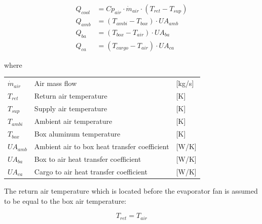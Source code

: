 \begin{align}
	Q_{cool}   & = Cp_{air} \cdot \dot{m}_{air} \cdot (T_{ret} - T_{sup})	\label{eq:box_Qcool} \\
	Q_{amb}    & = (T_{ambi} - T_{box}) \cdot U A_{amb}						\label{eq:box_Qab}   \\
	Q_{ba}     & = (T_{box} - T_{air}) \cdot U A_{ba}						\label{eq:box_Qba}   \\
	Q_{ca}     & = (T_{cargo} - T_{air}) \cdot U A_{ca}                  	\label{eq:box_Qca}
\end{align}

where
\begin{center}
	\begin{tabular}{l p{8cm} l}
		$\dot{m}_{air}$ & Air mass flow                                & [\si{kg}/{\si{s}}] \\
		$T_{ret}$       & Return air temperature                       & [\si{K}]           \\
		$T_{sup}$       & Supply air temperature                       & [\si{K}]           \\
		$T_{ambi}$      & Ambient air temperature                      & [\si{K}]           \\
		$T_{box}$       & Box aluminum temperature                     & [\si{K}]           \\
		$U A_{amb}$     & Ambient air to box heat transfer coefficient & [\si{W}/\si{K}]    \\
		$U A_{ba}$      & Box to air heat transfer coefficient         & [\si{W}/\si{K}]    \\
		$U A_{ca}$  	& Cargo to air heat transfer coefficient       & [\si{W}/\si{K}]    \\
	\end{tabular}
\end{center}


The return air temperature which is located before the evaporator fan is assumed to be equal to the box air temperature:

\begin{equation} \label{eq:box_Tref}
	T_{ret} = T_{air}
\end{equation}



